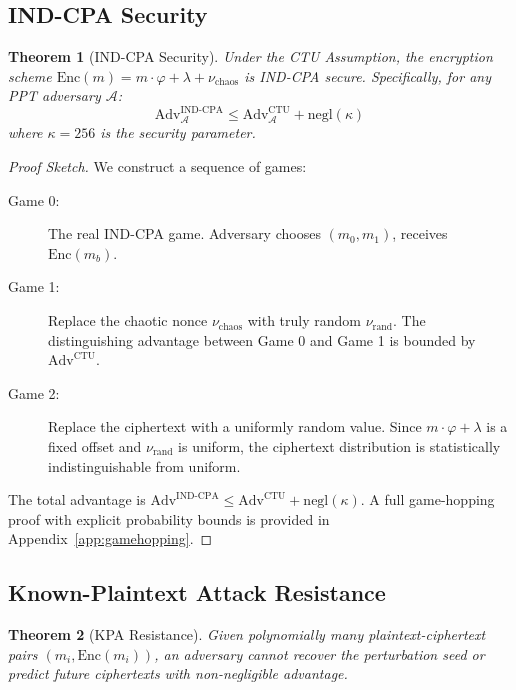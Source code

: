 \documentclass[11pt,a4paper]{article}
\newtheorem{theorem}{Theorem}[section]
\begin{document}
\subsection{IND-CPA Security}

\begin{theorem}[IND-CPA Security]
Under the CTU Assumption, the encryption scheme $\text{Enc}(m) = m \cdot \varphi + \lambda + \nu_{\text{chaos}}$ is IND-CPA secure. Specifically, for any PPT adversary $\mathcal{A}$:
\begin{equation}
    \text{Adv}^{\text{IND-CPA}}_{\mathcal{A}} \leq \text{Adv}^{\text{CTU}}_{\mathcal{A}} + \text{negl}(\kappa)
\end{equation}
where $\kappa = 256$ is the security parameter.
\end{theorem}

\begin{proof}[Proof Sketch]
We construct a sequence of games:
\begin{description}
    \item[Game 0:] The real IND-CPA game. Adversary chooses $(m_0, m_1)$, receives $\text{Enc}(m_b)$.
    \item[Game 1:] Replace the chaotic nonce $\nu_{\text{chaos}}$ with truly random $\nu_{\text{rand}}$. The distinguishing advantage between Game 0 and Game 1 is bounded by $\text{Adv}^{\text{CTU}}$.
    \item[Game 2:] Replace the ciphertext with a uniformly random value. Since $m \cdot \varphi + \lambda$ is a fixed offset and $\nu_{\text{rand}}$ is uniform, the ciphertext distribution is statistically indistinguishable from uniform.
\end{description}
The total advantage is $\text{Adv}^{\text{IND-CPA}} \leq \text{Adv}^{\text{CTU}} + \text{negl}(\kappa)$. A full game-hopping proof with explicit probability bounds is provided in Appendix~\ref{app:gamehopping}.
\end{proof}

\subsection{Known-Plaintext Attack Resistance}

\begin{theorem}[KPA Resistance]
Given polynomially many plaintext-ciphertext pairs $(m_i, \text{Enc}(m_i))$, an adversary cannot recover the perturbation seed or predict future ciphertexts with non-negligible advantage.
\end{theorem}
\end{document}
